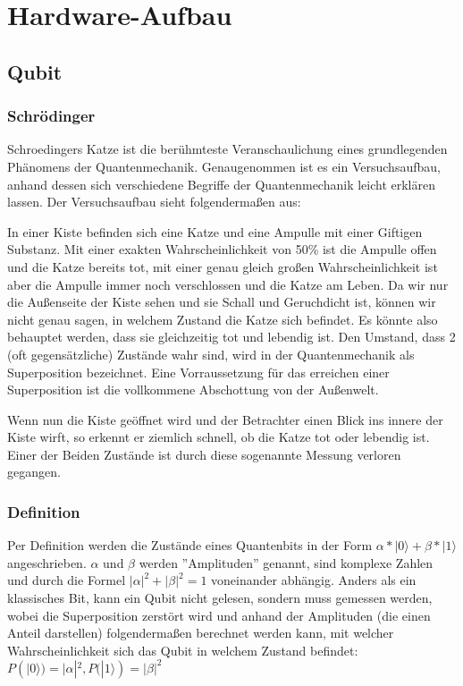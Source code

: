 
\section{Hardware-Aufbau}
\label{sec:Hardware-Aufbau}


\subsection{Qubit}
\label{sec:Qubit}

\subsubsection{Schrödinger}

Schroedingers Katze ist die berühmteste Veranschaulichung eines grundlegenden Phänomens der Quantenmechanik. Genaugenommen ist es ein Versuchsaufbau, anhand dessen sich verschiedene Begriffe der Quantenmechanik leicht erklären lassen. Der Versuchsaufbau sieht folgendermaßen aus:

In einer Kiste befinden sich eine Katze und eine Ampulle mit einer Giftigen Substanz. Mit einer exakten Wahrscheinlichkeit von 50\% ist die Ampulle offen und die Katze bereits tot, mit einer genau gleich großen Wahrscheinlichkeit ist aber die Ampulle immer noch verschlossen und die Katze am Leben. Da wir nur die Außenseite der Kiste sehen und sie Schall und Geruchdicht ist, können wir nicht genau sagen, in welchem Zustand die Katze sich befindet. Es könnte also behauptet werden, dass sie gleichzeitig tot und lebendig ist.
Den Umstand, dass 2 (oft gegensätzliche) Zustände wahr sind, wird in der Quantenmechanik als Superposition bezeichnet. Eine Vorraussetzung für das erreichen einer Superposition ist die vollkommene Abschottung von der Außenwelt. 

Wenn nun die Kiste geöffnet wird und der Betrachter einen Blick ins innere der Kiste wirft, so erkennt er ziemlich schnell, ob die Katze tot oder lebendig ist. Einer der Beiden Zustände ist durch diese sogenannte Messung verloren gegangen.

\subsubsection{Definition}

Per Definition werden die Zustände eines Quantenbits in der Form $\alpha * |0\rangle + \beta * |1\rangle$ angeschrieben.
$\alpha$ und $\beta$ werden ''Amplituden'' genannt, sind komplexe Zahlen und durch die Formel $|\alpha|^2 + |\beta|^2 = 1$ voneinander abhängig.
Anders als ein klassisches Bit, kann ein Qubit nicht gelesen, sondern muss gemessen werden, wobei die Superposition zerstört wird und anhand der Amplituden (die einen Anteil darstellen) folgendermaßen berechnet werden kann, mit welcher Wahrscheinlichkeit sich das Qubit in welchem Zustand befindet: $P(|0\rangle) = |\alpha|^2, P(|1\rangle) = |\beta|^2$

